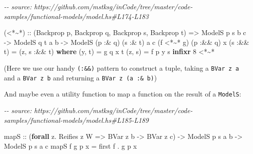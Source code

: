 \documentclass[]{article}
\newenvironment{Shaded}{}{}
\newcommand{\CommentTok}[1]{\textcolor[rgb]{0.38,0.63,0.69}{\textit{#1}}}
\newcommand{\DataTypeTok}[1]{\textcolor[rgb]{0.56,0.13,0.00}{#1}}
\newcommand{\DecValTok}[1]{\textcolor[rgb]{0.25,0.63,0.44}{#1}}
\newcommand{\KeywordTok}[1]{\textcolor[rgb]{0.00,0.44,0.13}{\textbf{#1}}}
\newcommand{\NormalTok}[1]{#1}
\newcommand{\OperatorTok}[1]{\textcolor[rgb]{0.40,0.40,0.40}{#1}}
\newcommand{\OtherTok}[1]{\textcolor[rgb]{0.00,0.44,0.13}{#1}}
\begin{document}
\begin{Shaded}
\begin{Highlighting}[]
\CommentTok{{-}{-} source: https://github.com/mstksg/inCode/tree/master/code{-}samples/functional{-}models/model.hs\#L174{-}L183}

\NormalTok{(}\OperatorTok{\textless{}*\textasciitilde{}*}\NormalTok{)}
\OtherTok{  ::}\NormalTok{ (}\DataTypeTok{Backprop}\NormalTok{ p, }\DataTypeTok{Backprop}\NormalTok{ q, }\DataTypeTok{Backprop}\NormalTok{ s, }\DataTypeTok{Backprop}\NormalTok{ t)}
    \OtherTok{=\textgreater{}} \DataTypeTok{ModelS}\NormalTok{  p        s       b c}
    \OtherTok{{-}\textgreater{}} \DataTypeTok{ModelS}\NormalTok{       q        t  a b}
    \OtherTok{{-}\textgreater{}} \DataTypeTok{ModelS}\NormalTok{ (p }\OperatorTok{:\&}\NormalTok{ q) (s }\OperatorTok{:\&}\NormalTok{ t) a c}
\NormalTok{(f }\OperatorTok{\textless{}*\textasciitilde{}*}\NormalTok{ g) (p }\OperatorTok{:\&\&}\NormalTok{ q) x (s }\OperatorTok{:\&\&}\NormalTok{ t) }\OtherTok{=}\NormalTok{ (z, s\textquotesingle{} }\OperatorTok{:\&\&}\NormalTok{ t\textquotesingle{})}
  \KeywordTok{where}
\NormalTok{    (y, t\textquotesingle{}) }\OtherTok{=}\NormalTok{ g q x t}
\NormalTok{    (z, s\textquotesingle{}) }\OtherTok{=}\NormalTok{ f p y s}
\KeywordTok{infixr} \DecValTok{8} \OperatorTok{\textless{}*\textasciitilde{}*}
\end{Highlighting}
\end{Shaded}

(Here we use our handy \texttt{(:\&\&)} pattern to construct a tuple, taking a
\texttt{BVar\ z\ a} and a \texttt{BVar\ z\ b} and returning a
\texttt{BVar\ z\ (a\ :\&\ b)})

And maybe even a utility function to map a function on the result of a
\texttt{ModelS}:

\begin{Shaded}
\begin{Highlighting}[]
\CommentTok{{-}{-} source: https://github.com/mstksg/inCode/tree/master/code{-}samples/functional{-}models/model.hs\#L185{-}L189}

\NormalTok{mapS}
\OtherTok{    ::}\NormalTok{ (}\KeywordTok{forall}\NormalTok{ z}\OperatorTok{.} \DataTypeTok{Reifies}\NormalTok{ z }\DataTypeTok{W} \OtherTok{=\textgreater{}} \DataTypeTok{BVar}\NormalTok{ z b }\OtherTok{{-}\textgreater{}} \DataTypeTok{BVar}\NormalTok{ z c)}
    \OtherTok{{-}\textgreater{}} \DataTypeTok{ModelS}\NormalTok{ p s a b}
    \OtherTok{{-}\textgreater{}} \DataTypeTok{ModelS}\NormalTok{ p s a c}
\NormalTok{mapS f g p x }\OtherTok{=}\NormalTok{ first f }\OperatorTok{.}\NormalTok{ g p x}
\end{Highlighting}
\end{Shaded}
\end{document}
